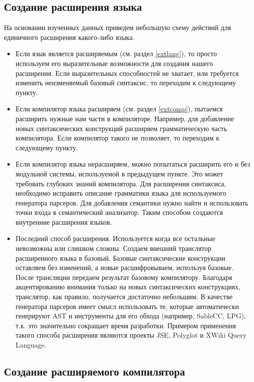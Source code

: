 \documentclass[a4paper,12pt,titlepage]{extarticle}
\begin{document}
\subsection{Создание расширения языка}
На основании изученных данных приведем небольшую схему действий для
единичного расширения какого-либо языка.
\begin{itemize}
  \item Если язык является расширяемым (см. раздел \ref{extlang}), то просто
  используем его выразительные возможности для создания нашего расширения.
  Если выразительных способностей не хватает, или требуется изменить
  неизменяемый базовый синтаксис, то переходим к следующему пункту.
  \item Если компилятор языка расширяем (см. раздел \ref{extcomp}), пытаемся
  расширить нужные нам части в компиляторе. Например, для добавление новых
  синтаксических конструкций расширяем грамматическую часть компилятора. Если
  компилятор такого не позволяет, то переходим к следующему пункту.
  \item Если компилятор языка нерасширяем, можно попытаться расширить его и
  без модульной системы, используемой в предыдущем пункте. Это может требовать
  глубоких знаний компилятора. Для расширения синтаксиса, необходимо исправить
  описание грамматики языка для используемого генератора парсеров. Для
  добавления семантики нужно найти и использовать точки входа в семантический
  анализатор. Таким способом создаются внутренние расширения языков.
  \item Последний способ расширения. Используется когда все остальные
  невозможны или слишком сложны. Создаем внешний транслятор расширенного языка
  в базовый. Базовые синтаксические конструкции оставляем без изменений, а
  новые расшифровываем, используя базовые. После трансляции передаем
  результат базовому компилятору.
  Благодаря акцентированию внимания только на новых синтаксических
  конструкциях, транслятор, как правило, получается достаточно небольшим. В
  качестве генератора парсеров имеет смысл использовать те, которые
  автоматически генерируют AST и инструменты для его обхода (например, SableCC,
  LPG), т.к. это значительно сокращает время разработки. Примером применения
  такого способа расширения являются проекты JSE, Polyglot и XWiki Query Language.
\end{itemize}

\subsection{Создание расширяемого компилятора}
\end{document}
